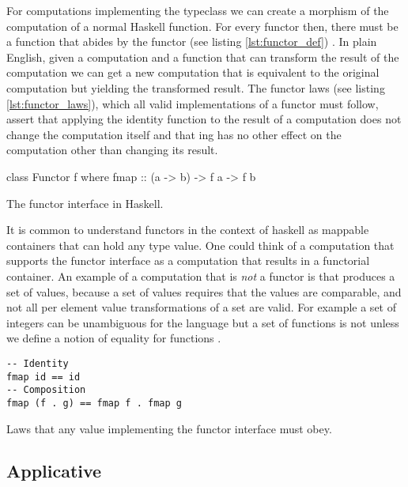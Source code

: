 For computations implementing the  typeclass we can
create a morphism of the computation of a normal Haskell
function. For every functor  then, there must be a function
 that abides by the functor (see
listing \ref{lst:functor_def})
\cite{mcbrideApplicativeProgrammingEffects2008}. In plain English,
given a computation and a function that can transform the result of
the computation we can get a new computation that is equivalent to the
original computation but yielding the transformed result. The functor
laws (see listing \ref{lst:functor_laws}), which all valid
implementations of a functor must follow, assert that applying the
identity function to the result of a computation does not change the
computation itself and that ing has no other effect on the
computation other than changing its result.
\begin{code}
\begin{haskellcode}
class Functor f where
  fmap :: (a -> b) -> f a -> f b
\end{haskellcode}
\caption{\label{lst:functor_def}The functor interface in Haskell.}
\end{code}

It is common to understand functors in the context of haskell as
mappable containers that can hold any type value. One could think of a
computation that supports the functor interface as a computation that
results in a functorial container. An example of a computation that is
\emph{not} a functor is that produces a set of values,
because a set of values requires that the values are comparable, and
not all per element value transformations of a set are valid. For
example a set of integers  can be unambiguous for the
language but a set of functions  is not
unless we define a notion of equality for functions .

\begin{code}
\begin{verbatim}
-- Identity
fmap id == id
-- Composition
fmap (f . g) == fmap f . fmap g
\end{verbatim}
\caption{\label{lst:functor_laws}Laws that any value implementing the functor interface must obey.}
\end{code}


  \subsection{Applicative}

